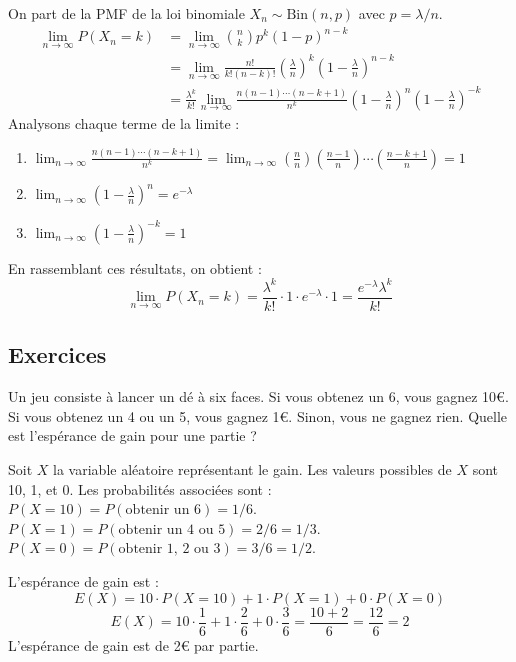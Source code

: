 \begin{proofbox}
On part de la PMF de la loi binomiale $X_n \sim \text{Bin}(n, p)$ avec $p=\lambda/n$.
\begin{align*}
\lim_{n \to \infty} P(X_n=k) &= \lim_{n \to \infty} \binom{n}{k} p^k (1-p)^{n-k} \\
&= \lim_{n \to \infty} \frac{n!}{k!(n-k)!} \left(\frac{\lambda}{n}\right)^k \left(1-\frac{\lambda}{n}\right)^{n-k} \\
&= \frac{\lambda^k}{k!} \lim_{n \to \infty} \frac{n(n-1)\cdots(n-k+1)}{n^k} \left(1-\frac{\lambda}{n}\right)^n \left(1-\frac{\lambda}{n}\right)^{-k}
\end{align*}
Analysons chaque terme de la limite :
\begin{enumerate}
    \item $\displaystyle \lim_{n \to \infty} \frac{n(n-1)\cdots(n-k+1)}{n^k} = \lim_{n \to \infty} \left(\frac{n}{n}\right)\left(\frac{n-1}{n}\right)\cdots\left(\frac{n-k+1}{n}\right) = 1$
    \item $\displaystyle \lim_{n \to \infty} \left(1-\frac{\lambda}{n}\right)^n = e^{-\lambda}$
    \item $\displaystyle \lim_{n \to \infty} \left(1-\frac{\lambda}{n}\right)^{-k} = 1$
\end{enumerate}
En rassemblant ces résultats, on obtient :
$$ \lim_{n \to \infty} P(X_n=k) = \frac{\lambda^k}{k!} \cdot 1 \cdot e^{-\lambda} \cdot 1 = \frac{e^{-\lambda}\lambda^k}{k!} $$
\end{proofbox}

\subsection{Exercices}

\begin{exercicebox}
Un jeu consiste à lancer un dé à six faces. Si vous obtenez un 6, vous gagnez 10€. Si vous obtenez un 4 ou un 5, vous gagnez 1€. Sinon, vous ne gagnez rien. Quelle est l'espérance de gain pour une partie ?
\end{exercicebox}

\begin{correctionbox}
Soit $X$ la variable aléatoire représentant le gain. Les valeurs possibles de $X$ sont 10, 1, et 0.
Les probabilités associées sont :
$P(X=10) = P(\text{obtenir un 6}) = 1/6$.
$P(X=1) = P(\text{obtenir un 4 ou 5}) = 2/6 = 1/3$.
$P(X=0) = P(\text{obtenir 1, 2 ou 3}) = 3/6 = 1/2$.

L'espérance de gain est :
$$ E(X) = 10 \cdot P(X=10) + 1 \cdot P(X=1) + 0 \cdot P(X=0) $$
$$ E(X) = 10 \cdot \frac{1}{6} + 1 \cdot \frac{2}{6} + 0 \cdot \frac{3}{6} = \frac{10+2}{6} = \frac{12}{6} = 2 $$
L'espérance de gain est de 2€ par partie.
\end{correctionbox}

